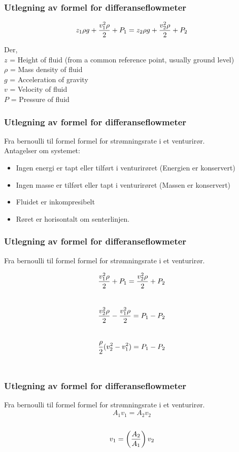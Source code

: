 \documentclass[aspectratio=169,xcolor=dvipsnames]{beamer}
\begin{document}
\begin{frame}
	\frametitle{Utlegning av formel for differanseflowmeter}

$$z_1 \rho g + {v_1^2 \rho \over 2} + P_1 = z_2 \rho g + {v_2^2 \rho \over 2} + P_2$$

\noindent
Der,
\\
$z$ = Height of fluid (from a common reference point, usually ground level)
\\
$\rho$ = Mass density of fluid
\\
$g$ = Acceleration of gravity
\\
$v$ = Velocity of fluid
\\
$P$ = Pressure of fluid
\end{frame}
\begin{frame}
	\frametitle{Utlegning av formel for differanseflowmeter}
	Fra bernoulli til formel formel for strømningsrate i et venturirør. 
	\\
	Antagelser om systemet:
\begin{itemize}

	\item Ingen energi er tapt eller tilført i venturirøret (Energien er konservert)
	\item Ingen masse er tilført eller tapt i venturirøret (Massen er konservert)
	\item Fluidet er inkompresibelt
	\item Røret er horisontalt om senterlinjen. 
\end{itemize}

\end{frame}

\begin{frame}
	\frametitle{Utlegning av formel for differanseflowmeter}
	Fra bernoulli til formel formel for strømningsrate i et venturirør. 

$${v_1^2 \rho \over 2} + P_1 = {v_2^2 \rho \over 2} + P_2$$
\\
$${v_2^2 \rho \over 2} - {v_1^2 \rho \over 2} = P_1 - P_2$$
\\
$${\rho \over 2} (v_2^2 - v_1^2) = P_1 - P_2$$
\\
\end{frame}

\begin{frame}
	\frametitle{Utlegning av formel for differanseflowmeter}
	Fra bernoulli til formel formel for strømningsrate i et venturirør. 
$$A_1 v_1 = A_2 v_2$$
\\
$$v_1 = \left({A_2 \over A_1}\right) v_2$$
\end{frame}
\end{document}

